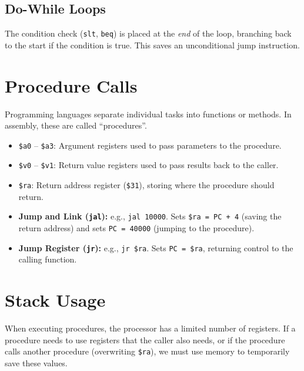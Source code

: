 \subsection{Do-While Loops}
The condition check (\texttt{slt}, \texttt{beq}) is placed at the \textit{end} of the loop, branching back to the start if the condition is true. This saves an unconditional jump instruction.

\section{Procedure Calls}

Programming languages separate individual tasks into functions or methods. In assembly, these are called ``procedures''.

\begin{vocabulary}
\begin{itemize}
    \item \texttt{\$a0} -- \texttt{\$a3}: Argument registers used to pass parameters to the procedure.
    \item \texttt{\$v0} -- \texttt{\$v1}: Return value registers used to pass results back to the caller.
    \item \texttt{\$ra}: Return address register (\texttt{\$31}), storing where the procedure should return.
\end{itemize}
\end{vocabulary}

\begin{definition}
\begin{itemize}
    \item \textbf{Jump and Link (\texttt{jal}):} e.g., \texttt{jal 10000}. Sets \texttt{\$ra = PC + 4} (saving the return address) and sets \texttt{PC = 40000} (jumping to the procedure).
    \item \textbf{Jump Register (\texttt{jr}):} e.g., \texttt{jr \$ra}. Sets \texttt{PC = \$ra}, returning control to the calling function.
\end{itemize}
\end{definition}

\section{Stack Usage}

When executing procedures, the processor has a limited number of registers. If a procedure needs to use registers that the caller also needs, or if the procedure calls another procedure (overwriting \texttt{\$ra}), we must use memory to temporarily save these values.

